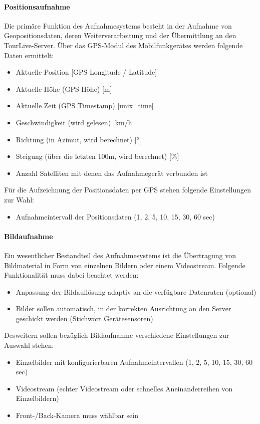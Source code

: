 \paragraph{Positionsaufnahme}
Die primäre Funktion des Aufnahmesystems besteht in der Aufnahme von Geopositionsdaten, deren Weiterverarbeitung und der Übermittlung an den TourLive-Server. Über das GPS-Modul des Mobilfunkgerätes werden folgende Daten ermittelt:
\begin{itemize}
\item Aktuelle Position [GPS Longitude / Latitude]
\item Aktuelle Höhe (GPS Höhe) [m]
\item Aktuelle Zeit (GPS Timestamp) [unix\_time]
\item Geschwindigkeit (wird gelesen) [km/h]
\item Richtung (in Azimut, wird berechnet) [°]
\item Steigung (über die letzten 100m, wird berechnet) [\%]
\item Anzahl Satelliten mit denen das Aufnahmegerät verbunden ist
\end{itemize}
Für die Aufzeichnung der Positionsdaten per GPS stehen folgende Einstellungen zur Wahl:
\begin{itemize}
\item Aufnahmeintervall der Positionsdaten (1, 2, 5, 10, 15, 30, 60 sec)
\end{itemize}

\paragraph{Bildaufnahme}
Ein wesentlicher Bestandteil des Aufnahmesystems ist die Übertragung von Bildmaterial in Form von einzelnen Bildern oder einem Videostream. Folgende Funktionalität muss dabei beachtet werden:
\begin{itemize}
\item Anpassung der Bildauflösung adaptiv an die verfügbare Datenraten (optional)
\item Bilder sollen automatisch, in der korrekten Ausrichtung an den Server geschickt werden (Stichwort Gerätesensoren)
\end{itemize}

Desweitern sollen bezüglich Bildaufnahme verschiedene Einstellungen zur Auswahl stehen:
\begin{itemize}
\item Einzelbilder mit konfigurierbaren Aufnahmeintervallen (1, 2, 5, 10, 15, 30, 60 sec)
\item Videostream (echter Videostream oder schnelles Aneinanderreihen von Einzelbildern)
\item Front-/Back-Kamera muss wählbar sein
\end{itemize}
	
